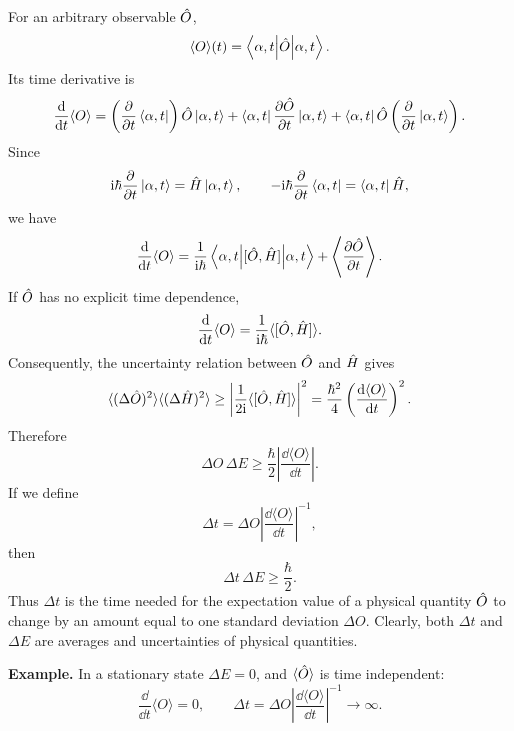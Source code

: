 For an arbitrary observable $\hat{O}$,
\begin{equation}
\langle O\rangle(t)=\left\langle\alpha,t\middle|\hat{O}\middle|\alpha,t\right\rangle.
\end{equation}
Its time derivative is
\begin{equation}
\frac{\mathrm{d}}{\mathrm{d} t}\langle O\rangle
=\left(\frac{\partial}{\partial t}\left\langle\alpha,t\right|\right)\hat{O}\left|\alpha,t\right\rangle
+\left\langle\alpha,t\right|\frac{\partial\hat{O}}{\partial t}\left|\alpha,t\right\rangle
+\left\langle\alpha,t\right|\hat{O}\left(\frac{\partial}{\partial t}\left|\alpha,t\right\rangle\right).
\end{equation}
Since
\begin{equation}
\mathrm{i}\hbar\frac{\partial}{\partial t}\left|\alpha,t\right\rangle=\hat{H}\left|\alpha,t\right\rangle,\qquad
-\mathrm{i}\hbar\frac{\partial}{\partial t}\left\langle\alpha,t\right|=\left\langle\alpha,t\right|\hat{H},
\end{equation}
we have
\begin{equation}
\frac{\mathrm{d}}{\mathrm{d} t}\langle O\rangle
=\frac1{\mathrm{i}\hbar}\left\langle\alpha,t\middle|[\hat{O},\hat{H}]\middle|\alpha,t\right\rangle
+\left\langle\frac{\partial\hat{O}}{\partial t}\right\rangle.
\end{equation}
If $\hat{O}$ has no explicit time dependence,
\begin{equation}
\frac{\mathrm{d}}{\mathrm{d} t}\langle O\rangle
=\frac1{\mathrm{i}\hbar}\langle[\hat{O},\hat{H}]\rangle.
\end{equation}
Consequently, the uncertainty relation between $\hat{O}$ and $\hat{H}$ gives
\begin{equation}
\langle(\Delta\hat{O})^2\rangle\langle(\Delta\hat{H})^2\rangle
\ge \left|\frac1{2\mathrm{i}}\langle[\hat{O},\hat{H}]\rangle\right|^2
=\frac{\hbar^2}{4}\left(\frac{\mathrm{d}\langle O\rangle}{\mathrm{d} t}\right)^2.
\end{equation}
Therefore
\begin{equation}
\Delta O\,\Delta E\ge\frac\hbar2\left|\frac{\dd\langle O\rangle}{\dd t}\right|.
\end{equation}
If we define
\begin{equation}
\Delta t=\Delta O\left|\frac{\dd\langle O\rangle}{\dd t}\right|^{-1},
\end{equation}
then
\begin{equation}
\boxed{\Delta t\,\Delta E\ge\frac\hbar2.}
\end{equation}
Thus $\Delta t$ is the time needed for the expectation value of a physical quantity $\hat{O}$ to change by an amount equal to one standard deviation $\Delta O$. Clearly, both $\Delta t$ and $\Delta E$ are averages and uncertainties of physical quantities.

\textbf{Example.} In a stationary state $\Delta E=0$, and $\langle\hat{O}\rangle$ is time independent:
\begin{equation}
\frac{\dd}{\dd t}\langle O\rangle=0,\qquad
\Delta t=\Delta O\left|\frac{\dd\langle O\rangle}{\dd t}\right|^{-1}\longrightarrow\infty.
\end{equation}